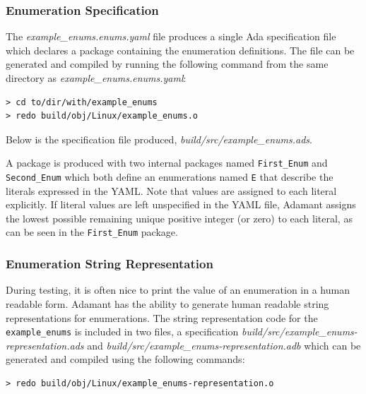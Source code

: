 \subsubsection{Enumeration Specification}

The \textit{example\_enums.enums.yaml} file produces a single Ada specification file which declares a package containing the enumeration definitions. The file can be generated and compiled by running the following command from the same directory as \textit{example\_enums.enums.yaml}:

\vspace{5mm} %
\begin{verbatim}
> cd to/dir/with/example_enums
> redo build/obj/Linux/example_enums.o
\end{verbatim}
\vspace{5mm} %

Below is the specification file produced, \textit{build/src/example\_enums.ads}.


A package is produced with two internal packages named \texttt{First\_Enum} and \texttt{Second\_Enum} which both define an enumerations named \texttt{E} that describe the literals expressed in the YAML. Note that values are assigned to each literal explicitly. If literal values are left unspecified in the YAML file, Adamant assigns the lowest possible remaining unique positive integer (or zero) to each literal, as can be seen in the \texttt{First\_Enum} package.

\subsubsection{Enumeration String Representation}

During testing, it is often nice to print the value of an enumeration in a human readable form. Adamant has the ability to generate human readable string representations for enumerations. The string representation code for the \texttt{example\_enums} is included in two files, a specification \textit{build/src/example\_enums-representation.ads} and \textit{build/src/example\_enums-representation.adb} which can be generated and compiled using the following commands: 

\vspace{5mm} %
\begin{verbatim}
> redo build/obj/Linux/example_enums-representation.o
\end{verbatim}
\vspace{5mm} %

